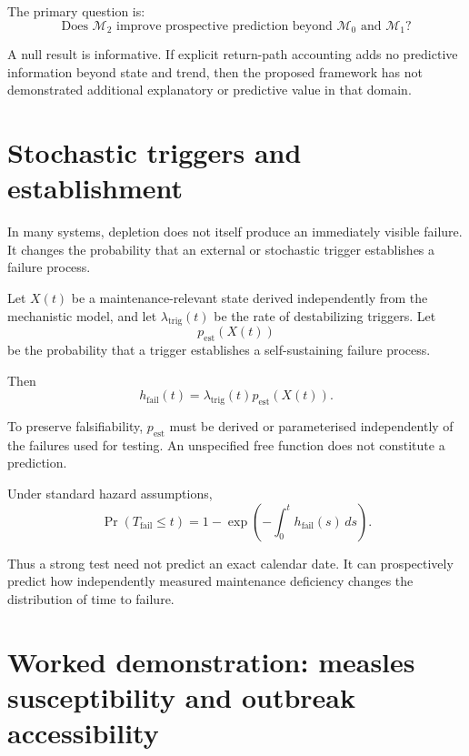 \documentclass[11pt,a4paper]{article}
\begin{document}
The primary question is:
\begin{equation}
\boxed{
\text{Does } \mathcal M_2
\text{ improve prospective prediction beyond }
\mathcal M_0
\text{ and }
\mathcal M_1?
}
\label{eq:primary-comparison}
\end{equation}

A null result is informative. If explicit return-path accounting adds no predictive information beyond state and trend, then the proposed framework has not demonstrated additional explanatory or predictive value in that domain.

\section{Stochastic triggers and establishment}

In many systems, depletion does not itself produce an immediately visible failure. It changes the probability that an external or stochastic trigger establishes a failure process.

Let $X(t)$ be a maintenance-relevant state derived independently from the mechanistic model, and let $\lambda_{\mathrm{trig}}(t)$ be the rate of destabilizing triggers. Let
\[
p_{\mathrm{est}}\!\left(X(t)\right)
\]
be the probability that a trigger establishes a self-sustaining failure process.

Then
\begin{equation}
h_{\mathrm{fail}}(t)
=
\lambda_{\mathrm{trig}}(t)
p_{\mathrm{est}}\!\left(X(t)\right).
\label{eq:hazard}
\end{equation}

To preserve falsifiability, $p_{\mathrm{est}}$ must be derived or parameterised independently of the failures used for testing. An unspecified free function does not constitute a prediction.

Under standard hazard assumptions,
\begin{equation}
\Pr(T_{\mathrm{fail}}\le t)
=
1-
\exp\left(
-\int_0^t h_{\mathrm{fail}}(s)\,ds
\right).
\label{eq:failure-cdf}
\end{equation}

Thus a strong test need not predict an exact calendar date. It can prospectively predict how independently measured maintenance deficiency changes the distribution of time to failure.

\section{Worked demonstration: measles susceptibility and outbreak accessibility}
\end{document}
